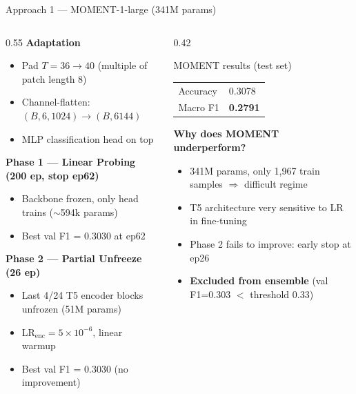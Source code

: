 \documentclass[aspectratio=169, 10pt]{beamer}
\begin{document}
\begin{frame}{Approach 1 — MOMENT-1-large (341M params)}
  \begin{columns}
    \begin{column}{0.55\textwidth}
      \textbf{Adaptation}
      \begin{itemize}
        \item Pad $T=36 \to 40$ (multiple of patch length 8)
        \item Channel-flatten: $(B,6,1024) \to (B,6144)$
        \item MLP classification head on top
      \end{itemize}
      \vspace{0.4em}
      \textbf{Phase 1 — Linear Probing (200 ep, stop ep62)}
      \begin{itemize}
        \item Backbone frozen, only head trains ($\sim$594k params)
        \item Best val F1 = 0.3030 at ep62
      \end{itemize}
      \vspace{0.3em}
      \textbf{Phase 2 — Partial Unfreeze (26 ep)}
      \begin{itemize}
        \item Last 4/24 T5 encoder blocks unfrozen (51M params)
        \item LR$_\text{enc}=5\times10^{-6}$, linear warmup
        \item Best val F1 = 0.3030 (no improvement)
      \end{itemize}
    \end{column}
    \begin{column}{0.42\textwidth}
      \begin{alertblock}{MOMENT results (test set)}
        \begin{center}
        \begin{tabular}{ll}
          \toprule
          Accuracy & 0.3078 \\
          Macro F1 & \textbf{0.2791} \\
          \bottomrule
        \end{tabular}
        \end{center}
      \end{alertblock}
      \vspace{0.4em}
      \textbf{Why does MOMENT underperform?}
      \begin{itemize}
        \item 341M params, only 1,967 train samples $\Rightarrow$ difficult regime
        \item T5 architecture very sensitive to LR in fine-tuning
        \item Phase 2 fails to improve: early stop at ep26
        \item \textbf{Excluded from ensemble} (val F1=0.303 $<$ threshold 0.33)
      \end{itemize}
    \end{column}
  \end{columns}
\end{frame}
\end{document}

